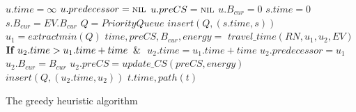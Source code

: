 \begin{algorithm}[!htb]
\begin{algorithmic}[1]
        \State $u.time = \infty$
        \State $u.predecessor = \textsc{nil}$
        \State $u.preCS = \textsc{nil}$
        \State $u.B_{cur} = 0$
    \EndFor
    \State $s.time = 0$
    \State $s.B_{cur} = EV.B_{cur}$
    \State $Q = PriorityQueue$
    \State $insert(Q, (s.time, s))$ 
        \State $u_1 = extractmin(Q)$
            \State $time,preCS,B_{cur},energy = $
            \State $travel\_time(RN, u_1, u_2, EV)$
            \State $\textbf{If }u_2.time > u_1.time + time \And$ 
                \State\hspace{0.5cm} $u_2.time = u_1.time + time$
                \State\hspace{0.5cm} $u_2.predecessor = u_1$
                \State\hspace{0.5cm} $u_2.B_{cur} = B_{cur}$
                \State\hspace{0.5cm} $u_2.preCS = update\_CS(preCS, energy)$
                \State\hspace{0.5cm} $insert(Q, (u_2.time, u_2))$ 
        \EndFor
    \EndWhile
    \State \Return $t.time, path(t)$
\EndFunction
\end{algorithmic}\caption{The greedy heuristic algorithm}\label{alg:fastest_path}
\end{algorithm}


